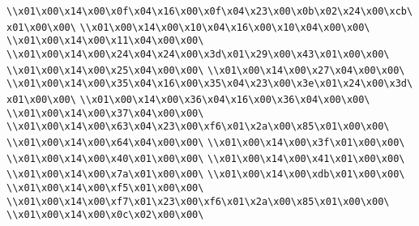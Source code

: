 \verb|\\x01\x00\x14\x00\x0f\x04\x16\x00\x0f\x04\x23\x00\x0b\x02\x24\x00\xcb\x01\x00\x00\|\newline
\verb|\\x01\x00\x14\x00\x10\x04\x16\x00\x10\x04\x00\x00\|\newline
\verb|\\x01\x00\x14\x00\x11\x04\x00\x00\|\newline
\verb|\\x01\x00\x14\x00\x24\x04\x24\x00\x3d\x01\x29\x00\x43\x01\x00\x00\|\newline
\verb|\\x01\x00\x14\x00\x25\x04\x00\x00\|\newline
\verb|\\x01\x00\x14\x00\x27\x04\x00\x00\|\newline
\verb|\\x01\x00\x14\x00\x35\x04\x16\x00\x35\x04\x23\x00\x3e\x01\x24\x00\x3d\x01\x00\x00\|\newline
\verb|\\x01\x00\x14\x00\x36\x04\x16\x00\x36\x04\x00\x00\|\newline
\verb|\\x01\x00\x14\x00\x37\x04\x00\x00\|\newline
\verb|\\x01\x00\x14\x00\x63\x04\x23\x00\xf6\x01\x2a\x00\x85\x01\x00\x00\|\newline
\verb|\\x01\x00\x14\x00\x64\x04\x00\x00\|\newline
\verb|\\x01\x00\x14\x00\x3f\x01\x00\x00\|\newline
\verb|\\x01\x00\x14\x00\x40\x01\x00\x00\|\newline
\verb|\\x01\x00\x14\x00\x41\x01\x00\x00\|\newline
\verb|\\x01\x00\x14\x00\x7a\x01\x00\x00\|\newline
\verb|\\x01\x00\x14\x00\xdb\x01\x00\x00\|\newline
\verb|\\x01\x00\x14\x00\xf5\x01\x00\x00\|\newline
\verb|\\x01\x00\x14\x00\xf7\x01\x23\x00\xf6\x01\x2a\x00\x85\x01\x00\x00\|\newline
\verb|\\x01\x00\x14\x00\x0c\x02\x00\x00\|\newline
